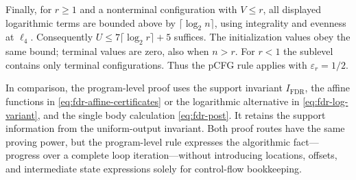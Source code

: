 Finally, for $r\geq1$ and a nonterminal configuration with $V\leq r$,
all displayed logarithmic terms are bounded above by
$\lceil\log_2 n\rceil$, using integrality and evenness at $\ell_4$.
Consequently $U\leq7\lceil\log_2r\rceil+5$ suffices.
The initialization values obey the same bound; terminal values are zero,
also when $n>r$. For $r<1$ the sublevel contains only terminal
configurations. Thus the pCFG rule applies with $\varepsilon_r=1/2$.

In comparison, the program-level proof uses the support invariant
$I_{\mathrm{FDR}}$, the affine functions in
\eqref{eq:fdr-affine-certificates} or the logarithmic alternative in
\eqref{eq:fdr-log-variant}, and the single body calculation
\eqref{eq:fdr-post}. It retains the support information from the
uniform-output invariant. Both proof routes have the same proving power, but the
program-level rule expresses the algorithmic fact---progress over a complete
loop iteration---without introducing locations, offsets, and intermediate
state expressions solely for control-flow bookkeeping.

